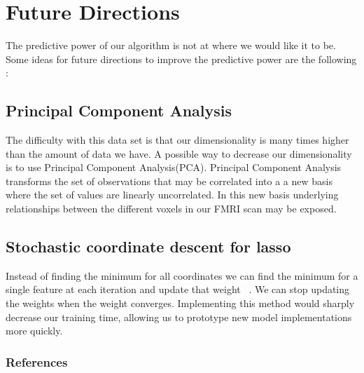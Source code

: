 \documentclass{article} %
\begin{document}
\section{Future Directions}

The predictive power of our algorithm is not at where we would like it to be. Some ideas for future directions to improve the predictive power are the following :

\subsection{Principal Component Analysis}
The difficulty with this data set is that our dimensionality is many times higher than the amount of data we have. A possible way to decrease our dimensionality is to use Principal Component Analysis(PCA).  Principal Component Analysis transforms the set of observations that may be correlated into a a new basis where the set of values are linearly uncorrelated. In this new basis underlying relationships between the different voxels in our FMRI scan may be exposed. 


\subsection{Stochastic coordinate descent for lasso}
Instead of finding the minimum for all coordinates we can find the minimum for a single feature at each iteration and update that weight ~\cite{shalev2011stochastic}. We can stop updating the weights when the weight converges. Implementing this method would sharply decrease our training time, allowing us to prototype new model implementations more quickly.


\subsubsection*{References}





\end{document}

